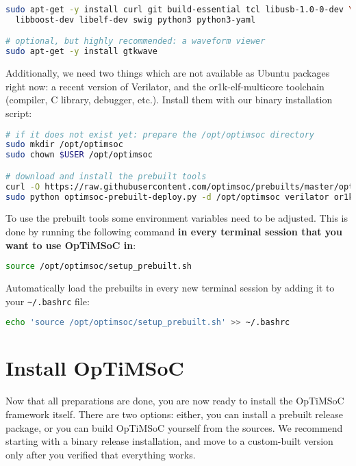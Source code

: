 \begin{lstlisting}[language=sh]
sudo apt-get -y install curl git build-essential tcl libusb-1.0-0-dev \
  libboost-dev libelf-dev swig python3 python3-yaml

# optional, but highly recommended: a waveform viewer
sudo apt-get -y install gtkwave
\end{lstlisting}

Additionally, we need two things which are not available as Ubuntu packages right now: a recent version of Verilator, and the or1k-elf-multicore toolchain (compiler, C library, debugger, etc.).
Install them with our binary installation script:

\begin{lstlisting}[language=sh]
# if it does not exist yet: prepare the /opt/optimsoc directory
sudo mkdir /opt/optimsoc
sudo chown $USER /opt/optimsoc

# download and install the prebuilt tools
curl -O https://raw.githubusercontent.com/optimsoc/prebuilts/master/optimsoc-prebuilt-deploy.py
sudo python optimsoc-prebuilt-deploy.py -d /opt/optimsoc verilator or1kelf
\end{lstlisting}

To use the prebuilt tools some environment variables need to be adjusted.
This is done by running the following command \textbf{in every terminal session that you want to use OpTiMSoC in}:

\begin{lstlisting}[language=sh]
source /opt/optimsoc/setup_prebuilt.sh
\end{lstlisting}

\begin{docnote}
Automatically load the prebuilts in every new terminal session by adding it to your \verb|~/.bashrc| file:

\begin{lstlisting}[language=sh]
echo 'source /opt/optimsoc/setup_prebuilt.sh' >> ~/.bashrc
\end{lstlisting}
\end{docnote}


\section{Install OpTiMSoC}
Now that all preparations are done, you are now ready to install the OpTiMSoC framework itself.
There are two options: either, you can install a prebuilt release package, or you can build OpTiMSoC yourself from the sources.
We recommend starting with a binary release installation, and move to a custom-built version only after you verified that everything works.

